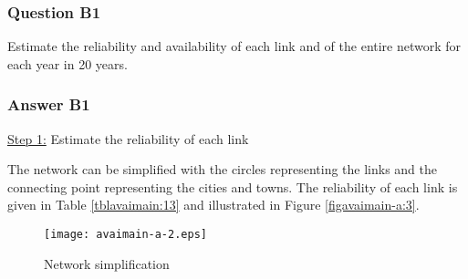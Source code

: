 \subsubsection{Question B1}

Estimate the reliability and availability of each link and of the entire
network for each year in 20 years.
\subsubsection{Answer B1}
\underline{Step 1:} Estimate the reliability of each link

The network can be simplified with the circles representing the links
and the connecting point representing the cities and towns. The reliability of
each link is given in Table \ref{tblavaimain:13} and illustrated in Figure \ref{figavaimain-a:3}.

\begin{figure}[h]
\texttt{[image: avaimain-a-2.eps]}
\caption{Network simplification}
\end{figure}

